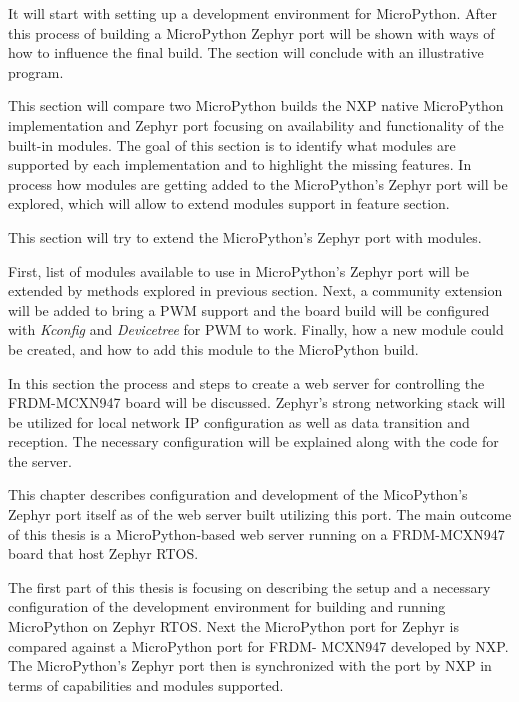 \documentclass[twoside, 12pt]{article}
\begin{document}
It will start with setting up a development environment for MicroPython. After this process 
of building a MicroPython Zephyr port will be shown with ways of how to influence the final 
build. The section will conclude with an illustrative program.

This section will compare two MicroPython builds the NXP native MicroPython implementation 
and Zephyr port focusing on availability and functionality of the built-in modules. The 
goal of this  section is to identify what modules are supported by each implementation and to 
highlight the missing features. In process how modules are getting added to the MicroPython's Zephyr port will be explored, which will allow to extend modules support in feature section.

This section will try to extend the MicroPython's Zephyr port with modules. 

First, list of modules available to use in MicroPython's Zephyr port will be extended by 
methods explored in previous section. Next, a community extension will be added to bring a 
PWM support and the board build will be configured with \textit{Kconfig} and 
\textit{Devicetree} for PWM to work. Finally, how a new module
could be created, and how to add this module to the MicroPython build.

In this section the process and steps to create a web server for controlling the
FRDM-MCXN947 board will be discussed. Zephyr's strong networking stack will be utilized for 
local network IP configuration as well as data transition and reception. The necessary 
configuration will be explained along with the code for the server.

This chapter describes configuration and development of the MicoPython's Zephyr port itself 
as of the web server built utilizing this port. The main outcome of this thesis is a MicroPython-based web server running on a FRDM-MCXN947 board that host Zephyr RTOS.

The first part of this thesis is focusing on describing the setup and a necessary 
configuration of the development environment for building and running MicroPython on Zephyr 
RTOS. Next the MicroPython port for Zephyr is compared against a MicroPython port for FRDM-
MCXN947  developed by NXP. The MicroPython's Zephyr port then is synchronized with the port 
by NXP in terms of capabilities and modules supported.
\end{document}
